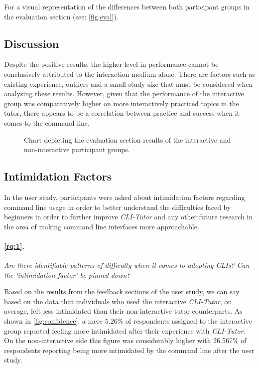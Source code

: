 For a visual representation of the differences between both participant groups
in the evaluation section (see: \autoref{fig:eval}).

\subsection{Discussion}

Despite the positive results, the higher level in performance cannot be
conclusively attributed to the interaction medium alone. There are factors such
as existing experience, outliers and a small study size that must be considered
when analysing these results. However, given that the performance of the
interactive group was comparatively higher on more interactively practiced
topics in the tutor, there appears to be a correlation between practice and
success when it comes to the command line.



\begin{figure}[htbp]
	\centering
	\scalebox{0.67}{}
	\caption{Chart depicting the evaluation section results of the interactive and non-interactive participant groups.}
	\label{fig:eval}
\end{figure}

\FloatBarrier %

\subsection{Intimidation Factors}

In the user study, participants were asked about intimidation factors regarding
command line usage in order to better understand the difficulties faced by
beginners in order to further improve \textit{CLI-Tutor} and any other future
research in the area of making command line interfaces more approachable.


\paragraph{\ref{rq:1}.} \textit{Are there identifiable patterns of difficulty when it comes to
adopting CLIs? Can the `intimidation factor' be pinned down?}

Based on the results from the feedback sections of the user study, we can say
based on the data that individuals who used the interactive \textit{CLI-Tutor},
on average, left less intimidated than their non-interactive tutor
counterparts. As shown in \autoref{fig:confidence}, a mere 5.26\% of
respondents assigned to the interactive group reported feeling more intimidated
after their experience with \textit{CLI-Tutor}. On the non-interactive side
this figure was considerably higher with 26.567\% of respondents reporting
being more intimidated by the command line after the user study.

